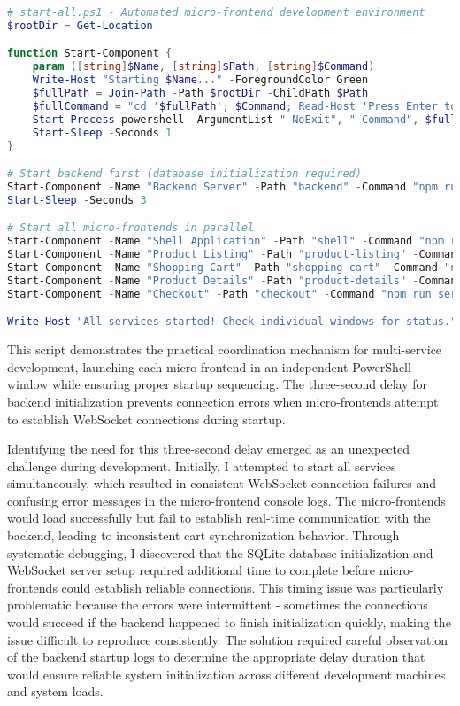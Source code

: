 \documentclass[12pt,a4paper]{report}
\begin{document}
\begin{lstlisting}[language=PowerShell, caption=Multi-Service Development Environment Startup Script]
# start-all.ps1 - Automated micro-frontend development environment
$rootDir = Get-Location

function Start-Component {
    param ([string]$Name, [string]$Path, [string]$Command)
    Write-Host "Starting $Name..." -ForegroundColor Green
    $fullPath = Join-Path -Path $rootDir -ChildPath $Path
    $fullCommand = "cd '$fullPath'; $Command; Read-Host 'Press Enter to exit'"
    Start-Process powershell -ArgumentList "-NoExit", "-Command", $fullCommand
    Start-Sleep -Seconds 1
}

# Start backend first (database initialization required)
Start-Component -Name "Backend Server" -Path "backend" -Command "npm run dev"
Start-Sleep -Seconds 3

# Start all micro-frontends in parallel
Start-Component -Name "Shell Application" -Path "shell" -Command "npm run serve"
Start-Component -Name "Product Listing" -Path "product-listing" -Command "npm run serve"
Start-Component -Name "Shopping Cart" -Path "shopping-cart" -Command "npm run serve"
Start-Component -Name "Product Details" -Path "product-details" -Command "npm run serve"
Start-Component -Name "Checkout" -Path "checkout" -Command "npm run serve"

Write-Host "All services started! Check individual windows for status." -ForegroundColor Yellow
\end{lstlisting}

This script demonstrates the practical coordination mechanism for multi-service development, launching each micro-frontend in an independent PowerShell window while ensuring proper startup sequencing. The three-second delay for backend initialization prevents connection errors when micro-frontends attempt to establish WebSocket connections during startup.

Identifying the need for this three-second delay emerged as an unexpected challenge during development. Initially, I attempted to start all services simultaneously, which resulted in consistent WebSocket connection failures and confusing error messages in the micro-frontend console logs. The micro-frontends would load successfully but fail to establish real-time communication with the backend, leading to inconsistent cart synchronization behavior. Through systematic debugging, I discovered that the SQLite database initialization and WebSocket server setup required additional time to complete before micro-frontends could establish reliable connections. This timing issue was particularly problematic because the errors were intermittent - sometimes the connections would succeed if the backend happened to finish initialization quickly, making the issue difficult to reproduce consistently. The solution required careful observation of the backend startup logs to determine the appropriate delay duration that would ensure reliable system initialization across different development machines and system loads.
\end{document}
